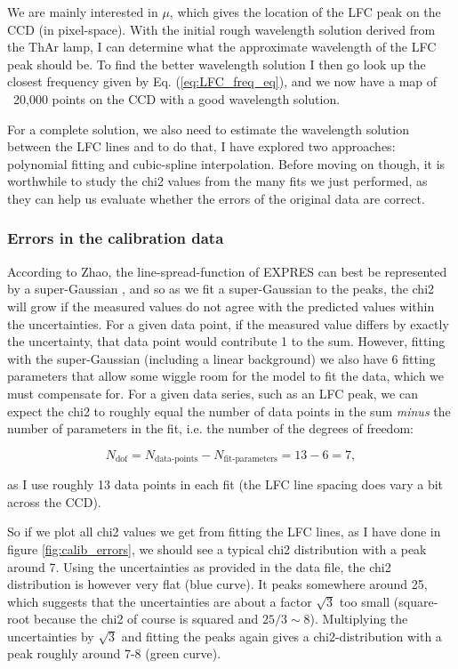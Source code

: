     We are mainly interested in $\mu$, which gives the location of the LFC peak on the CCD (in pixel-space). With the initial rough wavelength solution derived from the ThAr lamp, I can determine what the approximate wavelength of the LFC peak should be. To find the better wavelength solution I then go look up the closest frequency given by Eq. (\ref{eq:LFC_freq_eq}), and we now have a map of ~20,000 points on the CCD with a good wavelength solution. 
    
    For a complete solution, we also need to estimate the wavelength solution between the LFC lines and to do that, I have explored two approaches: polynomial fitting and cubic-spline interpolation. Before moving on though, it is worthwhile to study the chi2 values from the many fits we just performed, as they can help us evaluate whether the errors of the original data are correct.

    \subsubsection{Errors in the calibration data}

    According to Zhao, the line-spread-function of EXPRES can best be represented by a super-Gaussian \cite{yale_data}, and so as we fit a super-Gaussian to the peaks, the chi2 will grow if the measured values do not agree with the predicted values within the uncertainties. For a given data point, if the measured value differs by exactly the uncertainty, that data point would contribute 1 to the sum. However, fitting with the super-Gaussian (including a linear background) we also have 6 fitting parameters that allow some wiggle room for the model to fit the data, which we must compensate for. For a given data series, such as an LFC peak, we can expect the chi2 to roughly equal the number of data points in the sum \emph{minus} the number of parameters in the fit, i.e. the number of the degrees of freedom:
    
    \begin{equation}
        \label{eq:ndof}
        N_\text{dof} = N_\text{data-points} - N_\text{fit-parameters} =  13 - 6 = 7,
    \end{equation}

    as I use roughly 13 data points in each fit (the LFC line spacing does vary a bit across the CCD). 

    So if we plot all chi2 values we get from fitting the LFC lines, as I have done in figure \ref{fig:calib_errors}, we should see a typical chi2 distribution with a peak around 7. Using the uncertainties as provided in the data file, the chi2 distribution is however very flat (blue curve). It peaks somewhere around 25, which suggests that the uncertainties are about a factor $\sqrt{3}$ too small (square-root because the chi2 of course is squared and $25/3 \sim 8$). Multiplying the uncertainties by $\sqrt{3}$ and fitting the peaks again gives a chi2-distribution with a peak roughly around 7-8 (green curve).
                
